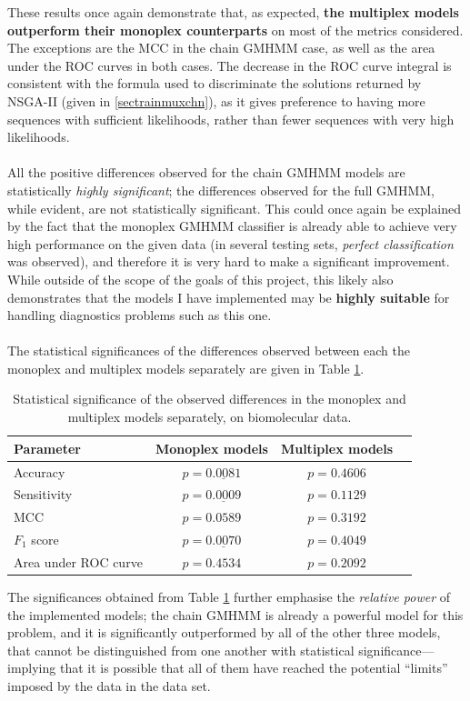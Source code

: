 \documentclass[12pt,a4paper,twoside,openright]{report}
\begin{document}
\noindent These results once again demonstrate that, as expected, \textbf{the multiplex models outperform their monoplex counterparts} on most of the metrics considered. The exceptions are the MCC in the chain GMHMM case, as well as the area under the ROC curves in both cases. The decrease in the ROC curve integral is consistent with the formula used to discriminate the solutions returned by NSGA-II (given in \cref{sectrainmuxchn}), as it gives preference to having more sequences with sufficient likelihoods, rather than fewer sequences with very high likelihoods.\\ \\
All the positive differences observed for the chain GMHMM models are statistically \emph{highly significant}; the differences observed for the full GMHMM, while evident, are not statistically significant. This could once again be explained by the fact that the monoplex GMHMM classifier is already able to achieve very high performance on the given data (in several testing sets, \emph{perfect classification} was observed), and therefore it is very hard to make a significant improvement. While outside of the scope of the goals of this project, this likely also demonstrates that the models I have implemented may be \textbf{highly suitable} for handling diagnostics problems such as this one.\\ \\
The statistical significances of the differences observed between each the monoplex and multiplex models separately are given in Table \ref{tblbiodata3}.
\begin{table}[h]\centering
\begin{tabular}{ l c c r } \toprule
{\bf Parameter} & {\bf Monoplex models} & {\bf Multiplex models} \\ \midrule
Accuracy & $p = \underline{0.0081}$ & $p = 0.4606$ \\
Sensitivity & $p = \underline{0.0009}$ & $p = 0.1129$ \\
MCC & $p = 0.0589$ & $p = 0.3192$ \\
$F_1$ score & $p = \underline{0.0070}$ & $p = 0.4049$ \\
Area under ROC curve & $p = 0.4534$ & $p = 0.2092$\\
\bottomrule
\end{tabular}
\caption[Evaluation results on the chain GMHMM on synthetic data]{\centering Statistical significance of the observed differences in the monoplex and multiplex models separately, on biomolecular data.}\label{tblbiodata3}
\end{table}
\noindent The significances obtained from Table \ref{tblbiodata3} further emphasise the \emph{relative power} of the implemented models; the chain GMHMM is already a powerful model for this problem, and it is significantly outperformed by all of the other three models, that cannot be distinguished from one another with statistical significance---implying that it is possible that all of them have reached the potential ``limits'' imposed by the data in the data set.
\end{document}
